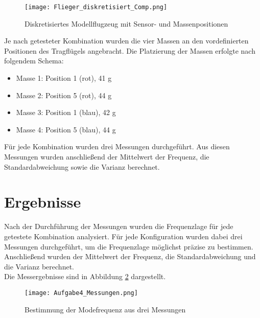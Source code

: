     \begin{figure}[H]
        \centering
        \texttt{[image: Flieger\_diskretisiert\_Comp.png]}
        \caption{Diskretisiertes Modellflugzeug mit Sensor- und Massenpositionen}
        \label{fig: Flieger_diskretisiert}
    \end{figure}

    \noindent
    Je nach getesteter Kombination wurden die vier Massen an den vordefinierten Positionen 
    des Tragflügels angebracht. Die Platzierung der Massen erfolgte nach folgendem Schema:

    \begin{itemize}
        \item Masse 1: Position 1 (rot), 41 g  
        \item Masse 2: Position 5 (rot), 44 g  
        \item Masse 3: Position 1 (blau), 42 g  
        \item Masse 4: Position 5 (blau), 44 g  
    \end{itemize}

    \noindent
    Für jede Kombination wurden drei Messungen durchgeführt. Aus diesen Messungen wurden 
    anschließend der Mittelwert der Frequenz, die Standardabweichung sowie die Varianz berechnet.
\section{Ergebnisse}
    Nach der Durchführung der Messungen wurden die Frequenzlage für jede getestete 
    Kombination analysiert. Für jede Konfiguration wurden dabei drei Messungen durchgeführt, 
    um die Frequenzlage möglichst präzise zu bestimmen. Anschließend wurden der Mittelwert der 
    Frequenz, die Standardabweichung und die Varianz berechnet.  
    \\

    \noindent
    Die Messergebnisse sind in Abbildung \ref{fig: Aufgabe4_Messungen} dargestellt.
    
    \begin{figure}[H]
        \centering
        \texttt{[image: Aufgabe4\_Messungen.png]}
        \caption{Bestimmung der Modefrequenz aus drei Messungen}
        \label{fig: Aufgabe4_Messungen}
    \end{figure}
    
